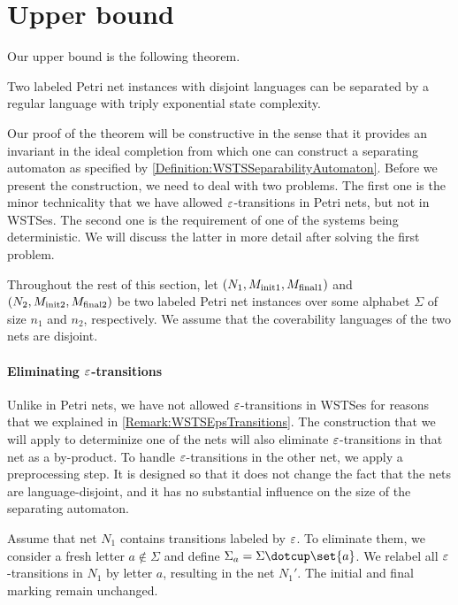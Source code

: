 \documentclass[../../diss.tex]{subfiles}
\begin{document}
\section{Upper bound}%
\label{Section:PNSeparabilityUpperBound}%

Our upper bound is the following theorem.

\begin{theorem}%
\label{Theorem:PNSeparabilityUpperBound}%
    Two labeled Petri net instances with disjoint languages can be separated by a regular language with triply exponential state complexity.
\end{theorem}

Our proof of the theorem will be constructive in the sense that it provides an invariant in the ideal completion from which one can construct a separating automaton as specified by \cref{Definition:WSTSSeparabilityAutomaton}.
Before we present the construction, we need to deal with two problems.
The first one is the minor technicality that we have allowed $\varepsilon$-transitions in Petri nets, but not in WSTSes.
The second one is the requirement of one of the systems being deterministic.
We will discuss the latter in more detail after solving the first problem.

Throughout the rest of this section, let $(N_1,M_{{\text{init}}1},M_{{\text{final}}1})$ and $(N_2,M_{{\text{init}}2},M_{{\text{final}}2})$ be two labeled Petri net instances over some alphabet $\Sigma$ of size $n_1$ and $n_2$, respectively.
We assume that the coverability languages of the two nets are disjoint.

\paragraph{Eliminating $\varepsilon$-transitions}

Unlike in Petri nets, we have not allowed $\varepsilon$-transitions in WSTSes for reasons that we explained in \cref{Remark:WSTSEpsTransitions}.
The construction that we will apply to determinize one of the nets will also eliminate $\varepsilon$-transitions in that net as a by-product.
To handle $\varepsilon$-transitions in the other net, we apply a preprocessing step.
It is designed so that it does not change the fact that the nets are language-disjoint, and it has no substantial influence on the size of the separating automaton.

Assume that net $N_1$ contains transitions labeled by $\varepsilon$.
To eliminate them, we consider a fresh letter $a \not\in \Sigma$ and define $\Sigma_a = \Sigma \dotcup \set{a}$.
We relabel all $\varepsilon$-transitions in $N_1$ by letter $a$, resulting in the net $N_1'$.
The initial and final marking remain unchanged.
\end{document}
